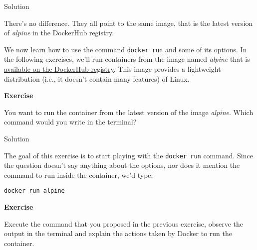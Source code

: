\documentclass[
]{article}
\newenvironment{infobox}[1]
  {
  \begin{itemize}
  \renewcommand{\labelitemi}{
    \raisebox{-.7\height}[0pt][0pt]{
      
    }
  }
  \setlength{\fboxsep}{1em}
  \begin{whitebox}
  \item
  }
  {
  \end{whitebox}
  \end{itemize}
  }
\theoremstyle{definition}
\theoremstyle{definition}
\theoremstyle{definition}
\theoremstyle{remark}
\let\BeginKnitrBlock\begin \let\EndKnitrBlock\end
\begin{document}
Solution

\begin{infobox}{exercisebox}

There's no difference. They all point to the same image, that is
the latest version of \emph{alpine} in the DockerHub registry.

\end{infobox}

We now learn how to use the command \texttt{docker\ run} and some of
its options.
In the following exercises, we'll run containers from the image named
\emph{alpine} that is
\href{https://hub.docker.com/_/alpine}{available on the DockerHub registry}.
This image provides a lightweight distribution
(i.e., it doesn't contain many features) of Linux.

\begin{infobox}{exercisebox}

\textbf{Exercise}

\BeginKnitrBlock{exercise}
\protect\hypertarget{exr:unnamed-chunk-3}{}{\label{exr:unnamed-chunk-3} }You want to run the container from the latest version of
the image \emph{alpine}.
Which command would you write in the terminal?
\EndKnitrBlock{exercise}

\end{infobox}

Solution

\begin{infobox}{exercisebox}

The goal of this exercise is to start playing with the
\texttt{docker\ run} command.
Since the question doesn't say anything about the
options, nor does it mention the command to run inside the container,
we'd type:

\begin{verbatim}
docker run alpine
\end{verbatim}

\end{infobox}

\begin{infobox}{exercisebox}

\textbf{Exercise}

\BeginKnitrBlock{exercise}
\protect\hypertarget{exr:unnamed-chunk-4}{}{\label{exr:unnamed-chunk-4} }Execute the command that you proposed in the previous exercise,
observe the output in the terminal and explain the actions
taken by Docker to run the container.
\EndKnitrBlock{exercise}

\end{infobox}
\end{document}
